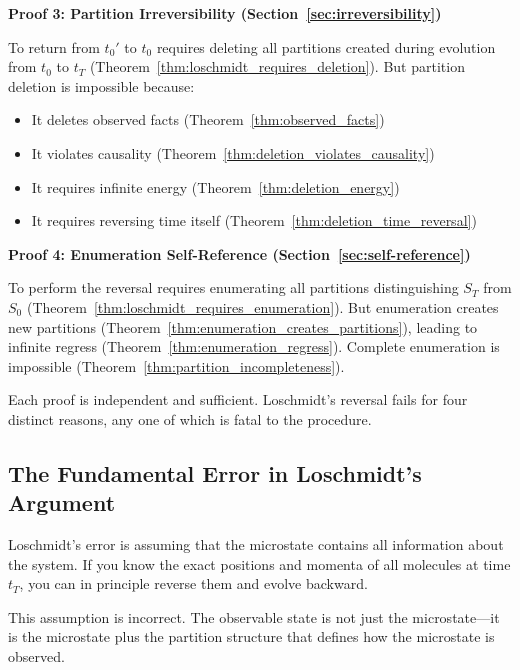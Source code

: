 \documentclass[twocolumn,10pt]{article}
\theoremstyle{definition}
\theoremstyle{remark}
\begin{document}
\vspace{0.2cm}
\noindent\textbf{Proof 3: Partition Irreversibility (Section~\ref{sec:irreversibility})}

To return from $t_0'$ to $t_0$ requires deleting all partitions created during evolution from $t_0$ to $t_T$ (Theorem~\ref{thm:loschmidt_requires_deletion}). But partition deletion is impossible because:
\begin{itemize}
\item It deletes observed facts (Theorem~\ref{thm:observed_facts})
\item It violates causality (Theorem~\ref{thm:deletion_violates_causality})
\item It requires infinite energy (Theorem~\ref{thm:deletion_energy})
\item It requires reversing time itself (Theorem~\ref{thm:deletion_time_reversal})
\end{itemize}

\vspace{0.2cm}
\noindent\textbf{Proof 4: Enumeration Self-Reference (Section~\ref{sec:self-reference})}

To perform the reversal requires enumerating all partitions distinguishing $S_T$ from $S_0$ (Theorem~\ref{thm:loschmidt_requires_enumeration}). But enumeration creates new partitions (Theorem~\ref{thm:enumeration_creates_partitions}), leading to infinite regress (Theorem~\ref{thm:enumeration_regress}). Complete enumeration is impossible (Theorem~\ref{thm:partition_incompleteness}).

\vspace{0.2cm}
\noindent Each proof is independent and sufficient. Loschmidt's reversal fails for four distinct reasons, any one of which is fatal to the procedure.

\subsection{The Fundamental Error in Loschmidt's Argument}

Loschmidt's error is assuming that the microstate contains all information about the system. If you know the exact positions and momenta of all molecules at time $t_T$, you can in principle reverse them and evolve backward.

\vspace{0.2cm}
\noindent This assumption is incorrect. The observable state is not just the microstate—it is the microstate plus the partition structure that defines how the microstate is observed.
\end{document}

